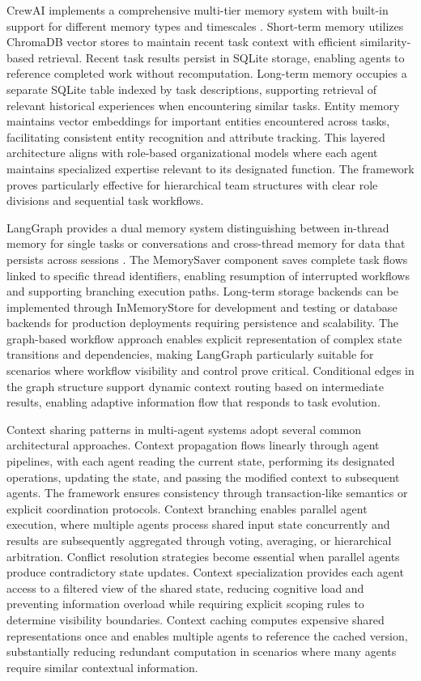 CrewAI implements a comprehensive multi-tier memory system with built-in support for different memory types and timescales \citep{datacamp2024comparison}. Short-term memory utilizes ChromaDB vector stores to maintain recent task context with efficient similarity-based retrieval. Recent task results persist in SQLite storage, enabling agents to reference completed work without recomputation. Long-term memory occupies a separate SQLite table indexed by task descriptions, supporting retrieval of relevant historical experiences when encountering similar tasks. Entity memory maintains vector embeddings for important entities encountered across tasks, facilitating consistent entity recognition and attribute tracking. This layered architecture aligns with role-based organizational models where each agent maintains specialized expertise relevant to its designated function. The framework proves particularly effective for hierarchical team structures with clear role divisions and sequential task workflows.

LangGraph provides a dual memory system distinguishing between in-thread memory for single tasks or conversations and cross-thread memory for data that persists across sessions \citep{langchain2024langgraph}. The MemorySaver component saves complete task flows linked to specific thread identifiers, enabling resumption of interrupted workflows and supporting branching execution paths. Long-term storage backends can be implemented through InMemoryStore for development and testing or database backends for production deployments requiring persistence and scalability. The graph-based workflow approach enables explicit representation of complex state transitions and dependencies, making LangGraph particularly suitable for scenarios where workflow visibility and control prove critical. Conditional edges in the graph structure support dynamic context routing based on intermediate results, enabling adaptive information flow that responds to task evolution.

Context sharing patterns in multi-agent systems adopt several common architectural approaches. Context propagation flows linearly through agent pipelines, with each agent reading the current state, performing its designated operations, updating the state, and passing the modified context to subsequent agents. The framework ensures consistency through transaction-like semantics or explicit coordination protocols. Context branching enables parallel agent execution, where multiple agents process shared input state concurrently and results are subsequently aggregated through voting, averaging, or hierarchical arbitration. Conflict resolution strategies become essential when parallel agents produce contradictory state updates. Context specialization provides each agent access to a filtered view of the shared state, reducing cognitive load and preventing information overload while requiring explicit scoping rules to determine visibility boundaries. Context caching computes expensive shared representations once and enables multiple agents to reference the cached version, substantially reducing redundant computation in scenarios where many agents require similar contextual information.

